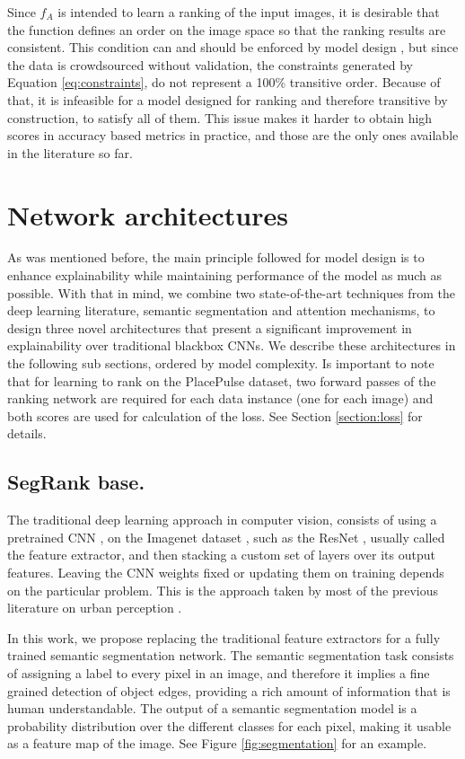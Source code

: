 Since $f_A$ is intended to learn a ranking of the input images, it is desirable that the function defines an order
on the image space so that the ranking results are consistent. This condition can and should be enforced by
model design \cite{koppel_pairwise}, but since the data is crowdsourced without
validation, the constraints generated by Equation \ref{eq:constraints}, do not represent a  100\% transitive order.
Because of that, it is infeasible for a model designed for ranking and therefore
transitive by construction, to satisfy all of them.
This issue makes it harder to obtain high scores in accuracy based metrics in practice, and
those are the only ones available in the literature so far.


\section{Network architectures}
\label{sec:nn_arch}
As was mentioned before, the main principle followed for model design is to enhance explainability
while maintaining performance of the model as much as possible. With that in mind, we combine two
state-of-the-art techniques from the deep learning literature, semantic segmentation
and attention mechanisms, to design three novel architectures that present a significant
improvement in explainability over traditional blackbox CNNs. We describe these architectures
in the following sub sections, ordered by model complexity. Is important to note that
for learning to rank on the PlacePulse dataset,
two forward passes of the ranking  network are required for each data instance (one for each image) and both scores are used
for calculation of the loss. See Section \ref{section:loss} for  details.


\subsection{SegRank base.}
The traditional deep learning approach in computer vision, consists of using a pretrained
CNN \cite{lecun_mnist}, on the Imagenet dataset \cite{imagenet}, such as the ResNet \cite{he_resnet},
usually called the feature extractor, and then stacking a custom set of layers over its output features. Leaving the CNN weights
fixed or updating them on training  depends on the particular problem. This is the approach taken
by most of the previous literature on urban perception \cite{hidalgo_placepulse,tamara_judgments,zhang_measuring}.

In this work, we propose replacing the traditional feature extractors for a fully trained semantic segmentation
network. The semantic segmentation task consists of assigning a label to every pixel in an image, and therefore
it implies a fine grained detection of object edges, providing a rich amount of information that is human understandable.
The output of a semantic segmentation model is a probability distribution over the different classes for each pixel,
making it usable as a feature map of the image. See Figure \ref{fig:segmentation} for an example.

